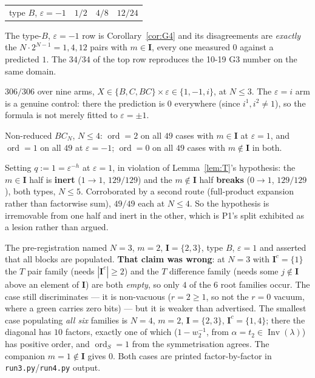 \documentclass[11pt]{article}
\theoremstyle{definition}
\theoremstyle{remark}
\DeclareMathOperator{\Inv}{Inv}
\DeclareMathOperator{\ord}{ord}
\newcommand{\bI}{\mathbf{I}}
\begin{document}
\begin{description}[leftmargin=1.4em]
\begin{center}
\begin{tabular}{llll}
   type $B$, $\varepsilon=-1$ & $1/2$ & $4/8$ & $12/24$\\
  \end{tabular}
  \end{center}
  The type-$B$, $\varepsilon=-1$ row is Corollary~\ref{cor:G4} and its disagreements are
  \emph{exactly} the $N\cdot2^{N-1}=1,4,12$ pairs with $m\in\bI$, every one measured $0$
  against a predicted $1$.  The $34/34$ of the top row reproduces the 10-19 G3 number on
  the same domain.
\item[Measurement B --- the general formula \eqref{eq:master}.]  $306/306$ over nine
  arms, $X\in\{B,C,BC\}\times\varepsilon\in\{1,-1,i\}$, at $N\le3$.  The
  $\varepsilon=i$ arm is a genuine control: there the prediction is $0$ everywhere
  (since $i^{1},i^{2}\ne1$), so the formula is not merely fitted to $\varepsilon=\pm1$.
\item[Measurement C --- the reducedness lesion.]  Non-reduced $BC_N$, $N\le4$:
  $\ord=2$ on all $49$ cases with $m\in\bI$ at $\varepsilon=1$, and $\ord=1$ on all $49$
  at $\varepsilon=-1$; $\ord=0$ on all $49$ cases with $m\notin\bI$ in both.
\item[Measurement D --- the split lesion.]  Setting $q:=1=\varepsilon^{-h}$ at
  $\varepsilon=1$, in violation of Lemma~\ref{lem:T}'s hypothesis: the $m\in\bI$ half is
  \textbf{inert} ($1\to1$, $129/129$) and the $m\notin\bI$ half \textbf{breaks}
  ($0\to1$, $129/129$), both types, $N\le5$.  Corroborated by a second route
  (full-product expansion rather than factorwise sum), $49/49$ each at $N\le4$.  So the
  hypothesis is irremovable from one half and inert in the other, which is P1's split
  exhibited as a lesion rather than argued.
\item[Positive control, named.]  The pre-registration named $N=3$, $m=2$,
  $\bI=\{2,3\}$, type $B$, $\varepsilon=1$ and asserted that all blocks are populated.
  \textbf{That claim was wrong}: at $N=3$ with $\bI^{c}=\{1\}$ the $T$ pair family
  (needs $|\bI^{c}|\ge2$) and the $T$ difference family (needs some $j\notin\bI$ above
  an element of $\bI$) are both \emph{empty}, so only $4$ of the $6$ root families
  occur.  The case still discriminates --- it is non-vacuous ($r=2\ge1$, so not the
  $r=0$ vacuum, where a green carries zero bits) --- but it is weaker than advertised.
  The smallest case populating \emph{all six} families is $N=4$, $m=2$,
  $\bI=\{2,3\}$, $\bI^{c}=\{1,4\}$; there the diagonal has $10$ factors, exactly one of
  which ($1-w_2^{-1}$, from $\alpha=t_2\in\Inv(\lambda)$) has positive order, and
  $\ord_S=1$ from the symmetrisation agrees.  The companion $m=1\notin\bI$ gives $0$.
  Both cases are printed factor-by-factor in \texttt{run3.py}/\texttt{run4.py} output.
\end{description}
\end{document}
